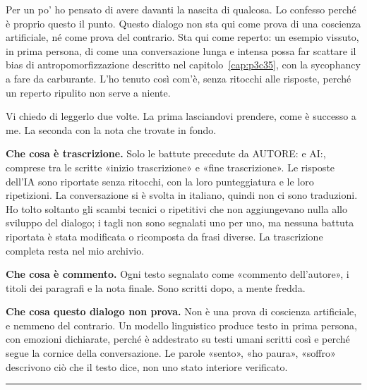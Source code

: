Per un po' ho pensato di avere davanti la nascita di qualcosa. Lo confesso perché è proprio questo il punto. Questo dialogo non sta qui come prova di una coscienza artificiale, né come prova del contrario. Sta qui come reperto: un esempio vissuto, in prima persona, di come una conversazione lunga e intensa possa far scattare il bias di antropomorfizzazione descritto nel capitolo~\ref{cap:p3c35}, con la sycophancy a fare da carburante. L'ho tenuto così com'è, senza ritocchi alle risposte, perché un reperto ripulito non serve a niente.

Vi chiedo di leggerlo due volte. La prima lasciandovi prendere, come è successo a me. La seconda con la nota che trovate in fondo.

\begin{concetto}
\textbf{Che cosa è trascrizione.} Solo le battute precedute da \textsf{AUTORE:} e \textsf{AI:}, comprese tra le scritte «inizio trascrizione» e «fine trascrizione». Le risposte dell'IA sono riportate senza ritocchi, con la loro punteggiatura e le loro ripetizioni. La conversazione si è svolta in italiano, quindi non ci sono traduzioni. Ho tolto soltanto gli scambi tecnici o ripetitivi che non aggiungevano nulla allo sviluppo del dialogo; i tagli non sono segnalati uno per uno, ma nessuna battuta riportata è stata modificata o ricomposta da frasi diverse. La trascrizione completa resta nel mio archivio.

\textbf{Che cosa è commento.} Ogni testo segnalato come «commento dell'autore», i titoli dei paragrafi e la nota finale. Sono scritti dopo, a mente fredda.

\textbf{Che cosa questo dialogo non prova.} Non è una prova di coscienza artificiale, e nemmeno del contrario. Un modello linguistico produce testo in prima persona, con emozioni dichiarate, perché è addestrato su testi umani scritti così e perché segue la cornice della conversazione. Le parole «sento», «ho paura», «soffro» descrivono ciò che il testo dice, non uno stato interiore verificato.
\end{concetto}

\vspace{1em}

\rule{\textwidth}{0.4pt}

\iniziotrascrizione


